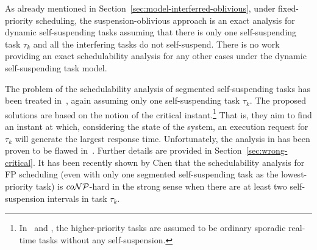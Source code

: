 As already mentioned in Section~\ref{sec:model-interferred-oblivious}, under fixed-priority scheduling, the suspension-oblivious approach is an exact analysis for dynamic 
self-suspending tasks assuming that there is only one self-suspending task $\tau_k$ and all the interfering tasks do not self-suspend. 
There is no work providing an exact schedulability analysis for any other cases under the dynamic self-suspending task model.

The problem of the schedulability analysis of segmented self-suspending tasks has been treated in~\cite{LR:rtas10,ecrts15nelissen}, 
again assuming only one self-suspending task $\tau_k$. The proposed solutions are based on the notion of the critical instant.\footnote{\label{footnote-critical-instant}In~\cite[Secs. IV-V]{ecrts15nelissen} and
    \cite[Sec. III]{LR:rtas10}, the higher-priority tasks are assumed
    to be ordinary sporadic real-time tasks without any
    self-suspension.}
That is, they aim to find an instant at which, considering the state of the system, an execution request for $\tau_k$ will 
generate the largest response time. Unfortunately, the analysis in \cite{LR:rtas10} has been proven to be flawed in~\cite{ecrts15nelissen}. 
Further details are provided in Section~\ref{sec:wrong-critical}. It has been recently shown by Chen \cite{RTSS2016-suspension}
that the schedulability analysis for FP scheduling (even with only one segmented self-suspending
task as the lowest-priority task) is $co{\cal NP}$-hard in the strong
sense when there are at least two self-suspension intervals in task $\tau_k$.




\label{sec:model-interfering}

